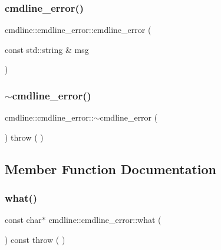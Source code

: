 \subsubsection{\texorpdfstring{cmdline\_error()}{cmdline\_error()}}
{\footnotesize\ttfamily cmdline\+::cmdline\+\_\+error\+::cmdline\+\_\+error (\begin{DoxyParamCaption}\item[{const std\+::string \&}]{msg }\end{DoxyParamCaption})\hspace{0.3cm}{\ttfamily [inline]}}

\mbox{\label{classcmdline_1_1cmdline__error_a4fb14d65b75bf0dd97a84e76f571a8be}} 
\subsubsection{\texorpdfstring{$\sim$cmdline\_error()}{~cmdline\_error()}}
{\footnotesize\ttfamily cmdline\+::cmdline\+\_\+error\+::$\sim$cmdline\+\_\+error (\begin{DoxyParamCaption}{ }\end{DoxyParamCaption}) throw ( ) \hspace{0.3cm}{\ttfamily [inline]}}



\subsection{Member Function Documentation}
\mbox{\label{classcmdline_1_1cmdline__error_a95d8810a6a9372dba775829300d9a1cb}} 
\subsubsection{\texorpdfstring{what()}{what()}}
{\footnotesize\ttfamily const char$\ast$ cmdline\+::cmdline\+\_\+error\+::what (\begin{DoxyParamCaption}{ }\end{DoxyParamCaption}) const throw ( ) \hspace{0.3cm}{\ttfamily [inline]}}



